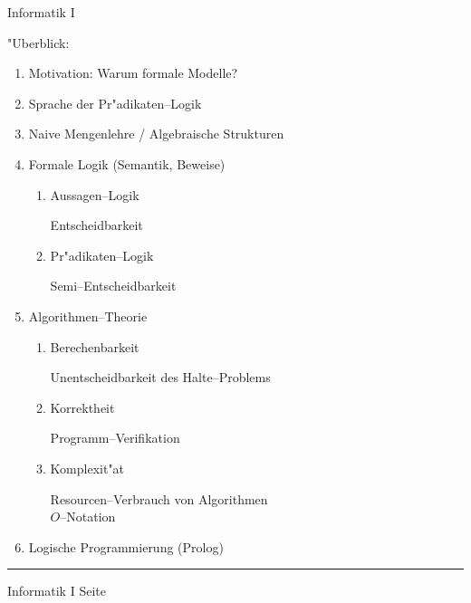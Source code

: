 
\begin{slide}{}
\normalsize
\begin{center}
Informatik I 
\end{center}
\vspace{0.5cm}

\footnotesize

"Uberblick: 
\begin{enumerate}
\item Motivation: Warum formale Modelle?
\item Sprache der Pr"adikaten--Logik
\item Naive Mengenlehre / Algebraische Strukturen
\item Formale Logik (Semantik, Beweise)
  \begin{enumerate}
        \item Aussagen--Logik

              Entscheidbarkeit
        \item Pr"adikaten--Logik

              Semi--Entscheidbarkeit
  \end{enumerate}
\item Algorithmen--Theorie
  \begin{enumerate}
  \item Berechenbarkeit

        Unentscheidbarkeit des Halte--Problems
  \item Korrektheit 

        Programm--Verifikation
  \item Komplexit"at 

        Resourcen--Verbrauch von Algorithmen \\
        $O$--Notation
  \end{enumerate}
\item Logische Programmierung (Prolog)
\end{enumerate}

\setcounter{page}{1}
\vspace*{\fill}
\tiny \addtocounter{mypage}{1}
\rule{15cm}{1mm}
Informatik I  \hspace*{\fill} Seite 
\end{slide}


